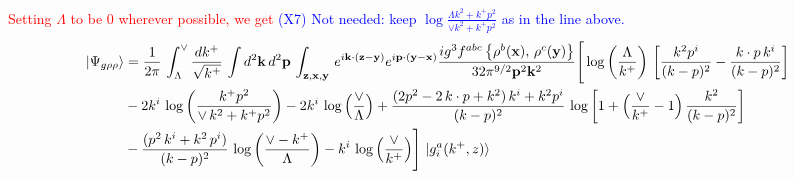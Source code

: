 \documentclass[aps,prd,amsmath,amssymb,nofootinbib]{revtex4-2}
\def\v#1{\mathbf{#1}}
\numberwithin{equation}{section}
\begin{document}
\textcolor{red}{Setting $\Lambda $ to be $0$ wherever possible, we get} \textcolor{blue}{(X7) Not needed: keep $\log\frac{\Lambda k^{2}+k^{+}p^{2}}{\vee k^{2}+k^{+}p^{2}}$ as in the line above.}
\begin{align}\label{combinedgrhorhopos}
    \left|\Psi_{g\rho\rho}\right\rangle & =  \frac{1}{2\pi}\,\int_{\Lambda}^{\vee}\frac{dk^{+}}{\sqrt{k^{+}}}\,\int d^{2}\mathbf{k}\, d^{2}\mathbf{p}\,\int_{\v{z},\v{x},\v{y}}\, e^{i\v{k}\cdot (\v{z}-\v{y})} e^{i\v{p}\cdot (\v{y}-\v{x})}\frac{ig^{3}f^{abc}\left\{ \rho^{b}(\mathbf{x}),\,\rho^{c}(\mathbf{y})\right\}}{32\pi^{9/2}\mathbf{p}^{2}\mathbf{k}^{2}}\Bigg[\log{\left(\frac{\Lambda}{k^{+}}\right)}\,\left[\frac{k^{2}p^{i}}{(k-p)^{2}}-\frac{k\cdot p\,k^{i}}{(k-p)^{2}}\right]\notag \\ & -2k^{i}\,\log{\left(\frac{k^{+}p^{2}}{\vee\, k^{2}+k^{+}p^{2}}\right)}-2k^{i}\,\log{\left(\frac{\vee}{\Lambda}\right)}+\frac{(2p^{2}-2\,k\cdot p + k^{2})\,k^{i} + k^{2}p^{i}}{(k-p)^{2}}\, \log{\left[1+\left(\frac{\vee}{k^{+}}-1\right)\frac{k^{2}}{(k-p)^{2}}\right]}\notag \\ & - \frac{(p^{2}\,k^{i}+k^{2}\,p^{i})}{(k-p)^{2}}\, \log{\left(\frac{\vee - k^{+}}{\Lambda}\right)}-k^{i}\, \log{\left(\frac{\vee}{k^{+}}\right)}\Bigg]\, \ket{g^{a}_{i}(k^{+},z)}
\end{align}
\end{document}
